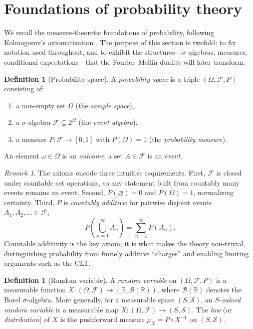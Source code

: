 \documentclass[12pt]{amsart}
\theoremstyle{definition}
\newtheorem{definition}[theorem]{Definition}
\theoremstyle{remark}
\newtheorem*{remark}{Remark}
\newcommand{\R}{\mathbb{R}}
\newcommand{\cF}{\mathcal{F}}
\begin{document}
\section{Foundations of probability theory}\label{sec:probability}

We recall the measure-theoretic foundations of probability, following Kolmogorov's axiomatization \cite{Billingsley,Durrett}. The purpose of this section is twofold: to fix notation used throughout, and to exhibit the structures---$\sigma$-algebras, measures, conditional expectations---that the Fourier--Mellin duality will later transform.

\begin{definition}[Probability space]\label{def:prob-space}
A \emph{probability space} is a triple $(\Omega, \cF, P)$ consisting of:
\begin{enumerate}[label=(\roman*)]
\item a non-empty set $\Omega$ (the \emph{sample space}),
\item a $\sigma$-algebra $\cF \subseteq 2^\Omega$ (the \emph{event algebra}),
\item a measure $P : \cF \to [0,1]$ with $P(\Omega) = 1$ (the \emph{probability measure}).
\end{enumerate}
An element $\omega \in \Omega$ is an \emph{outcome}; a set $A \in \cF$ is an \emph{event}.
\end{definition}

\begin{remark}
The axioms encode three intuitive requirements. First, $\cF$ is closed under countable set operations, so any statement built from countably many events remains an event. Second, $P(\varnothing) = 0$ and $P(\Omega) = 1$, normalizing certainty. Third, $P$ is \emph{countably additive}: for pairwise disjoint events $A_1, A_2, \ldots \in \cF$,
\[
P\!\left(\bigcup_{n=1}^\infty A_n\right) = \sum_{n=1}^\infty P(A_n).
\]
Countable additivity is the key axiom; it is what makes the theory non-trivial, distinguishing probability from finitely additive ``charges'' and enabling limiting arguments such as the CLT.
\end{remark}

\begin{definition}[Random variable]\label{def:rv}
A \emph{random variable} on $(\Omega, \cF, P)$ is a measurable function $X : (\Omega, \cF) \to (\R, \mathcal{B}(\R))$, where $\mathcal{B}(\R)$ denotes the Borel $\sigma$-algebra. More generally, for a measurable space $(S, \mathcal{S})$, an \emph{$S$-valued random variable} is a measurable map $X : (\Omega, \cF) \to (S, \mathcal{S})$. The \emph{law} (or \emph{distribution}) of $X$ is the pushforward measure $\mu_X = P \circ X^{-1}$ on $(S, \mathcal{S})$.
\end{definition}
\end{document}

